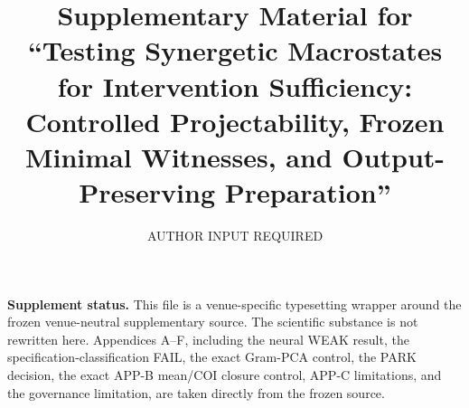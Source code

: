 \documentclass[aip,cha,reprint,amsmath,amssymb]{revtex4-2}
\begin{document}
\title{Supplementary Material for ``Testing Synergetic Macrostates for Intervention Sufficiency: Controlled Projectability, Frozen Minimal Witnesses, and Output-Preserving Preparation''}
\author{AUTHOR INPUT REQUIRED}
\maketitle

\noindent\textbf{Supplement status.} This file is a venue-specific typesetting wrapper around the frozen venue-neutral supplementary source. The scientific substance is not rewritten here. Appendices A--F, including the neural WEAK result, the specification-classification FAIL, the exact Gram-PCA control, the PARK decision, the exact APP-B mean/COI closure control, APP-C limitations, and the governance limitation, are taken directly from the frozen source.

\end{document}
